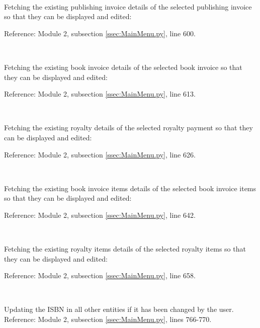 \

Fetching the existing publishing invoice details of the selected publishing invoice so that they can be displayed and edited:
\begin{tiny}
\end{tiny}
Reference: Module 2,  subsection \ref{ssec:MainMenu.py}, line 600.

\

Fetching the existing book invoice details of the selected book invoice so that they can be displayed and edited:
\begin{tiny}
\end{tiny}
Reference: Module 2,  subsection \ref{ssec:MainMenu.py}, line 613.

\

Fetching the existing royalty details of the selected royalty payment so that they can be displayed and edited:
\begin{tiny}
\end{tiny}
Reference: Module 2,  subsection \ref{ssec:MainMenu.py}, line 626.

\

Fetching the existing book invoice items details of the selected book invoice items so that they can be displayed and edited:
\begin{tiny}
\end{tiny}
Reference: Module 2,  subsection \ref{ssec:MainMenu.py}, line 642.

\

Fetching the existing royalty items details of the selected royalty items so that they can be displayed and edited:
\begin{tiny}
\end{tiny}
Reference: Module 2,  subsection \ref{ssec:MainMenu.py}, line 658.

\

Updating the ISBN in all other entities if it has been changed by the user.
Reference: Module 2,  subsection \ref{ssec:MainMenu.py}, lines 766-770.

\

